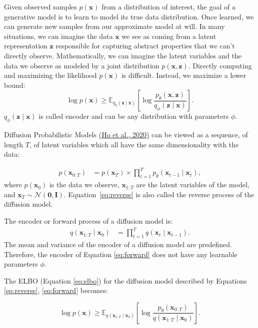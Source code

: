 \documentclass[11pt,addpoints,answers]{exam}
\newcommand{\xv}{\mathbf{x}}
\begin{document}
\begin{questions}
Given observed samples $p(\xv)$
from a distribution of interest, the goal of a generative model is to learn to model its true data distribution.  Once learned, we can generate new samples from our approximate model at will. In many situations, we can imagine the data $\xv$ we see as coming from a latent representation $\boldsymbol{z}$ responsible for capturing abstract properties that we can't directly observe. Mathematically, we can imagine the latent variables and the data we observe as modeled by a joint distribution $p(\xv, \boldsymbol{z})$. Directly computing and maximizing the likelihood $p(\xv)$ is difficult. Instead, we maximize a lower bound: 
\begin{equation}
   \log  p(\xv) \ge \mathbb{E}_{q_\phi(\boldsymbol{z}\mid \xv)}\left[\log \frac{p_\theta(\xv,\boldsymbol{z})}{q_\phi(\boldsymbol{z}\mid \xv)}\right].
    \label{eq:elbo}
\end{equation}
$q_\phi(\boldsymbol{z}\mid \xv)$ is called encoder and can be any distribution with parameters $\phi$.

Diffusion Probabilistic Models \href{https://arxiv.org/pdf/2006.11239.pdf}{(Ho et al., 2020)} can be viewed as a sequence, of length $T$, of latent variables which all have the same dimensionality with the data:

\begin{align}
p(\xv_{0:T}) &= p(\xv_T) \times \prod_{t=1}^{T}p_{\theta}(\xv_{t-1} \mid \xv_t),
\label{eq:reverse}
\end{align}
where $p(\xv_0)$ is the data we observe, $\xv_{1:T}$ are the latent variables of the model, and $\xv_T \sim \mathcal{N}(\boldsymbol{0},\boldsymbol{I})$. Equation~\eqref{eq:reverse} is also called the reverse process of the diffusion model.

The encoder or forward process of a diffusion model is:
\begin{align}
q(\xv_{1:T}\mid \xv_0) &=  \prod_{t=1}^{T}q(\xv_{t} \mid \xv_{t-1}).
\label{eq:forward}
\end{align}
The mean and variance of the encoder of a diffusion model are predefined. Therefore, the encoder of Equation \ref{eq:forward} does not have any learnable parameters $\phi$.

The ELBO (Equation \ref{eq:elbo}) for the diffusion model described by Equations \ref{eq:reverse}, \ref{eq:forward} becomes:

\begin{equation}
   \log p(\xv) \ge \mathbb{E}_{q(\xv_{1:T}\mid \xv_0)}\left[\log \frac{p_\theta(\xv_{0:T})}{q(\xv_{1:T}\mid \xv_0)}\right].
    \label{eq:elbo_diffusion}
\end{equation}


\end{questions}
\end{document}

